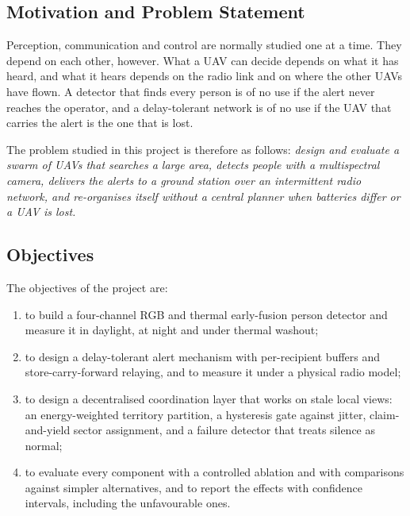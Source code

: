\documentclass[10pt,letterpaper]{article}
\begin{document}
\subsection{Motivation and Problem Statement}
Perception, communication and control are normally studied one at a time. They depend on each other, however. What a UAV can decide depends on what it has heard, and what it hears depends on the radio link and on where the other UAVs have flown. A detector that finds every person is of no use if the alert never reaches the operator, and a delay-tolerant network is of no use if the UAV that carries the alert is the one that is lost.

The problem studied in this project is therefore as follows: \emph{design and evaluate a swarm of UAVs that searches a large area, detects people with a multispectral camera, delivers the alerts to a ground station over an intermittent radio network, and re-organises itself without a central planner when batteries differ or a UAV is lost.}

\subsection{Objectives}
The objectives of the project are:
\begin{enumerate}
\item to build a four-channel RGB and thermal early-fusion person detector and measure it in daylight, at night and under thermal washout;
\item to design a delay-tolerant alert mechanism with per-recipient buffers and store-carry-forward relaying, and to measure it under a physical radio model;
\item to design a decentralised coordination layer that works on stale local views: an energy-weighted territory partition, a hysteresis gate against jitter, claim-and-yield sector assignment, and a failure detector that treats silence as normal;
\item to evaluate every component with a controlled ablation and with comparisons against simpler alternatives, and to report the effects with confidence intervals, including the unfavourable ones.
\end{enumerate}
\end{document}

